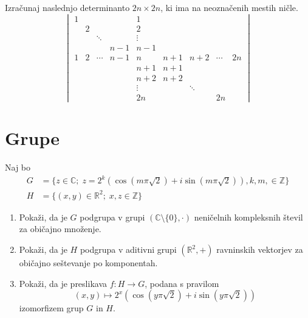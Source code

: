 \documentclass[a4paper,12pt]{article}
\begin{document}
Izračunaj naslednjo determinanto \(2n \times 2n\), ki ima na neoznačenih mestih ničle.
\[
\begin{vmatrix}    
 1 & & & & 1 \\
 & 2 & & & 2 \\
 & & \ddots & & \vdots \\
 & & & n-1 & n-1 \\
 1 & 2 & \cdots & n-1 & n & n+1 & n+2 & \cdots & 2n \\
 & & & & n+1 & n+1 \\
 & & & & n+2 & n+2 \\
 & & & & \vdots & & \ddots \\
 & & & & 2n & & & 2n
\end{vmatrix}
\]

\section*{Grupe}

Naj bo
\begin{align*}
    G &= \{z \in \mathbb{C};\; z = 2^k(\cos(m \pi \sqrt{2}) + i \sin(m \pi \sqrt{2})), k, m, \in \mathbb{Z}\} \\
    H &= \{(x, y) \in \mathbb{R}^2; \; x, z \in \mathbb{Z}\}
\end{align*}

\begin{enumerate}
\item
Pokaži, da je \(G\) podgrupa v grupi \((\mathbb{C} \setminus \{0\}, \cdot)\)
neničelnih kompleksnih števil za običajno množenje.

\item
Pokaži, da je \(H\) podgrupa v aditivni grupi \((\mathbb{R}^2, +)\)
ravninskih vektorjev za običajno seštevanje po komponentah.

\item
Pokaži, da je preslikava \(f:H\to G\), podana s pravilom
\[
(x, y) \mapsto 2^x (\cos(y \pi \sqrt{2}) + i \sin(y \pi \sqrt{2}))
\]
izomorfizem grup \(G\) in \(H\).
\end{enumerate}
\end{document}
